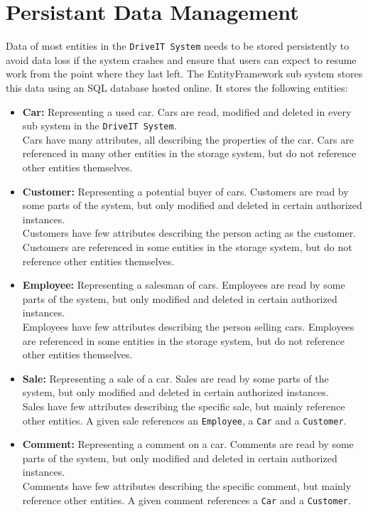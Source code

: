 \section{Persistant Data Management}
Data of most entities in the \texttt{DriveIT System} needs to be stored persistently to avoid data loss if the system crashes and ensure that users can expect to resume work from the point where they last left.
The EntityFramework sub system stores this data using an SQL database hosted online. 
It stores the following entities:
\begin{itemize}
	\item \textbf{Car:} Representing a used car. Cars are read, modified and deleted in every sub system in the \texttt{DriveIT System}.\\
	Cars have many attributes, all describing the properties of the car. Cars are referenced in many other entities in the storage system, but do not reference other entities themselves.\\
	\item \textbf{Customer:} Representing a potential buyer of cars. Customers are read by some parts of the system, but only modified and deleted in certain authorized instances. \\
	Customers have few attributes describing the person acting as the customer. Customers are referenced in some entities in the storage system, but do not reference other entities themselves.
	\item \textbf{Employee:} Representing a salesman of cars. Employees are read by some parts of the system, but only modified and deleted in certain authorized instances. \\
	Employees have few attributes describing the person selling cars. Employees are referenced in some entities in the storage system, but do not reference other entities themselves.
	\item \textbf{Sale:} Representing a sale of a car. Sales are read by some parts of the system, but only modified and deleted in certain authorized instances. \\
	Sales have few attributes describing the specific sale, but mainly reference other entities. A given sale references an \texttt{Employee}, a \texttt{Car} and a \texttt{Customer}.
	\item \textbf{Comment:} Representing a comment on a car. Comments are read by some parts of the system, but only modified and deleted in certain authorized instances. \\
	Comments have few attributes describing the specific comment, but mainly reference other entities. A given comment references a \texttt{Car} and a \texttt{Customer}.

\end{itemize}
